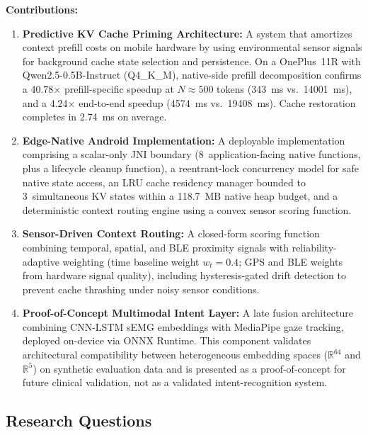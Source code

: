 \documentclass[journal]{IEEEtran}
\begin{document}
\textbf{Contributions:}

\begin{enumerate}
    \item \textbf{Predictive KV Cache Priming Architecture:} A system that amortizes context prefill costs on mobile hardware by using environmental sensor signals for background cache state selection and persistence. On a OnePlus~11R with Qwen2.5-0.5B-Instruct (Q4\_K\_M), native-side prefill decomposition confirms a 40.78$\times$ prefill-specific speedup at $N \approx 500$ tokens (343~ms vs.\ 14001~ms), and a 4.24$\times$ end-to-end speedup (4574~ms vs.\ 19408~ms). Cache restoration completes in 2.74~ms on average.

    \item \textbf{Edge-Native Android Implementation:} A deployable implementation comprising a scalar-only JNI boundary (8~application-facing native functions, plus a lifecycle cleanup function), a reentrant-lock concurrency model for safe native state access, an LRU cache residency manager bounded to 3~simultaneous KV states within a 118.7~MB native heap budget, and a deterministic context routing engine using a convex sensor scoring function.

    \item \textbf{Sensor-Driven Context Routing:} A closed-form scoring function combining temporal, spatial, and BLE proximity signals with reliability-adaptive weighting (time baseline weight $w_t = 0.4$; GPS and BLE weights from hardware signal quality), including hysteresis-gated drift detection to prevent cache thrashing under noisy sensor conditions.

    \item \textbf{Proof-of-Concept Multimodal Intent Layer:} A late fusion architecture combining CNN-LSTM sEMG embeddings with MediaPipe gaze tracking, deployed on-device via ONNX Runtime. This component validates architectural compatibility between heterogeneous embedding spaces ($\mathbb{R}^{64}$ and $\mathbb{R}^{5}$) on synthetic evaluation data and is presented as a proof-of-concept for future clinical validation, not as a validated intent-recognition system.
\end{enumerate}

\subsection{Research Questions}
\label{sec:rqs}
\end{document}
